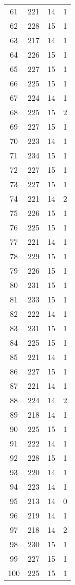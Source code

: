 \begin{longtable}[!]{c|ccc}
	61	& 221	& 14	& 1	\\
	62	& 228	& 15	& 1	\\
	63	& 217	& 14	& 1	\\
	64	& 226	& 15	& 1	\\
	65	& 227	& 15	& 1	\\
	66	& 225	& 15	& 1	\\
	67	& 224	& 14	& 1	\\
	68	& 225	& 15	& 2	\\
	69	& 227	& 15	& 1	\\
	70	& 223	& 14	& 1	\\
	71	& 234	& 15	& 1	\\
	72	& 227	& 15	& 1	\\
	73	& 227	& 15	& 1	\\
	74	& 221	& 14	& 2	\\
	75	& 226	& 15	& 1	\\
	76	& 225	& 15	& 1	\\
	77	& 221	& 14	& 1	\\
	78	& 229	& 15	& 1	\\
	79	& 226	& 15	& 1	\\
	80	& 231	& 15	& 1	\\
	81	& 233	& 15	& 1	\\
	82	& 222	& 14	& 1	\\
	83	& 231	& 15	& 1	\\
	84	& 225	& 15	& 1	\\
	85	& 221	& 14	& 1	\\
	86	& 227	& 15	& 1	\\
	87	& 221	& 14	& 1	\\
	88	& 224	& 14	& 2	\\
	89	& 218	& 14	& 1	\\
	90	& 225	& 15	& 1	\\
	91	& 222	& 14	& 1	\\
	92	& 228	& 15	& 1	\\
	93	& 220	& 14	& 1	\\
	94	& 223	& 14	& 1	\\
	95	& 213	& 14	& 0	\\
	96	& 219	& 14	& 1	\\
	97	& 218	& 14	& 2	\\
	98	& 230	& 15	& 1	\\
	99	& 227	& 15	& 1	\\
	100	& 225	& 15	& 1	\\
\end{longtable}


